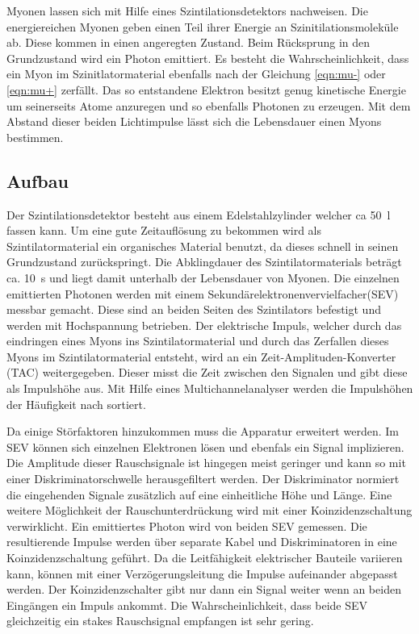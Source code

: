 Myonen lassen sich mit Hilfe eines Szintilationsdetektors nachweisen.
Die energiereichen Myonen geben einen Teil ihrer Energie an Szinitilationsmoleküle ab.
Diese kommen in einen angeregten Zustand.
Beim Rücksprung in den Grundzustand wird ein Photon emittiert.
Es besteht die Wahrscheinlichkeit, dass ein Myon im Szinitlatormaterial ebenfalls nach der Gleichung \ref{eqn:mu-}
oder \ref{eqn:mu+} zerfällt.
Das so entstandene Elektron besitzt genug kinetische Energie um seinerseits Atome anzuregen und so ebenfalls Photonen zu erzeugen.
Mit dem Abstand dieser beiden Lichtimpulse lässt sich die Lebensdauer einen Myons bestimmen.

\subsection{Aufbau}
Der Szintilationsdetektor besteht aus einem Edelstahlzylinder welcher ca \SI{50}{l} fassen kann.
Um eine gute Zeitauflösung zu bekommen wird als Szintilatormaterial ein organisches Material benutzt,
da dieses schnell in seinen Grundzustand zurückspringt.
Die Abklingdauer des Szintilatormaterials beträgt ca. \SI{10}{s} und liegt damit unterhalb der Lebensdauer von Myonen.
Die einzelnen emittierten Photonen werden mit einem Sekundärelektronenvervielfacher(SEV) messbar gemacht.
Diese sind an beiden Seiten des Szintilators befestigt und werden mit Hochspannung betrieben.
Der elektrische Impuls, welcher durch das eindringen eines Myons ins Szintilatormaterial
und durch das Zerfallen dieses Myons im Szintilatormaterial entsteht,
wird an ein Zeit-Amplituden-Konverter (TAC) weitergegeben.
Dieser misst die Zeit zwischen den Signalen und gibt diese als Impulshöhe aus.
Mit Hilfe eines Multichannelanalyser werden die Impulshöhen der Häufigkeit nach sortiert.

Da einige Störfaktoren hinzukommen muss die Apparatur erweitert werden.
Im SEV können sich einzelnen Elektronen lösen und ebenfals ein Signal implizieren.
Die Amplitude dieser Rauschsignale ist hingegen meist geringer und kann so mit einer Diskriminatorschwelle herausgefiltert werden.
Der Diskriminator normiert die eingehenden Signale zusätzlich auf eine einheitliche Höhe und Länge.
Eine weitere Möglichkeit der Rauschunterdrückung wird mit einer Koinzidenzschaltung verwirklicht.
Ein emittiertes Photon wird von beiden SEV gemessen.
Die resultierende Impulse werden über separate Kabel und Diskriminatoren in eine Koinzidenzschaltung geführt.
Da die Leitfähigkeit elektrischer Bauteile variieren kann,
können mit einer Verzögerungsleitung die Impulse aufeinander abgepasst werden.
Der Koinzidenzschalter gibt nur dann ein Signal weiter wenn an beiden Eingängen ein Impuls ankommt.
Die Wahrscheinlichkeit, dass beide SEV gleichzeitig ein stakes Rauschsignal empfangen ist sehr gering.

